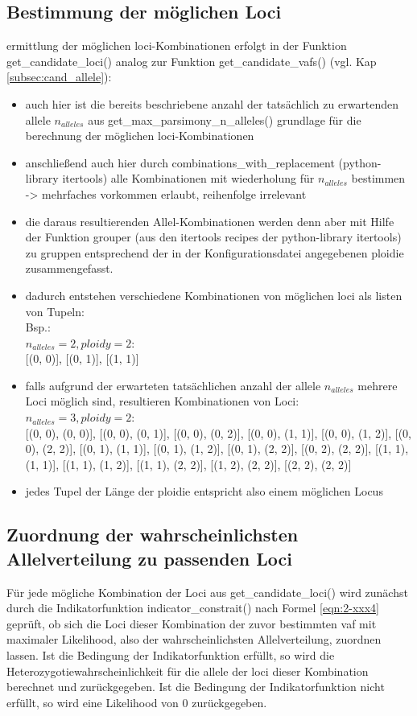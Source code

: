 \subsection{Bestimmung der möglichen Loci} \label{subsec:max}
ermittlung der möglichen loci-Kombinationen erfolgt in der Funktion get\_candidate\_loci() analog zur Funktion get\_candidate\_vafs() (vgl. Kap \ref{subsec:cand_allele}):
\begin{itemize}
	\item auch hier ist die bereits beschriebene anzahl der tatsächlich zu erwartenden allele $n_{alleles}$ aus get\_max\_parsimony\_n\_alleles() grundlage für die berechnung der möglichen loci-Kombinationen 
	\item anschließend auch hier durch combinations\_with\_replacement (python-library itertools) alle Kombinationen mit wiederholung für $n_{alleles} $ bestimmen -> mehrfaches vorkommen erlaubt, reihenfolge irrelevant 
	\item die daraus resultierenden Allel-Kombinationen werden denn aber mit Hilfe der Funktion grouper (aus den itertools recipes der python-library itertools) zu gruppen entsprechend der in der Konfigurationsdatei angegebenen ploidie zusammengefasst.
	\item dadurch entstehen verschiedene Kombinationen von möglichen loci als listen von Tupeln:\\
		Bsp.: \\
	    $ n_{alleles} = 2, ploidy = 2$: \\
	    {[(0, 0)]}, {[(0, 1)]}, {[(1, 1)]} \\
	\item falls aufgrund der erwarteten tatsächlichen anzahl der allele $n_{alleles} $ mehrere Loci möglich sind, resultieren Kombinationen von Loci:\\
	    $ n_{alleles} = 3, ploidy = 2$: \\
	    {[(0, 0), (0, 0)]}, {[(0, 0), (0, 1)]}, {[(0, 0), (0, 2)]}, {[(0, 0), (1, 1)]}, {[(0, 0), (1, 2)]}, {[(0, 0), (2, 2)]}, {[(0, 1), (1, 1)]}, {[(0, 1), (1, 2)]}, {[(0, 1), (2, 2)]}, {[(0, 2), (2, 2)]}, {[(1, 1), (1, 1)]}, {[(1, 1), (1, 2)]}, {[(1, 1), (2, 2)]}, {[(1, 2), (2, 2)]}, {[(2, 2), (2, 2)]} \\
	\item jedes Tupel der Länge der ploidie entspricht also einem möglichen Locus
\end{itemize}

\subsection{Zuordnung der wahrscheinlichsten Allelverteilung zu passenden Loci} \label{subsec:lh_loci}
Für jede mögliche Kombination der Loci  aus get\_candidate\_loci() wird zunächst durch die Indikatorfunktion indicator\_constrait() nach Formel \eqref{eqn:2-xxx4} geprüft, ob sich die Loci dieser Kombination der zuvor bestimmten vaf mit maximaler Likelihood, also der wahrscheinlichsten Allelverteilung, zuordnen lassen. Ist die Bedingung der Indikatorfunktion erfüllt, so wird die Heterozygotiewahrscheinlichkeit für die allele der loci dieser Kombination berechnet und zurückgegeben. Ist die Bedingung der Indikatorfunktion nicht erfüllt, so wird eine Likelihood von 0 zurückgegeben.

